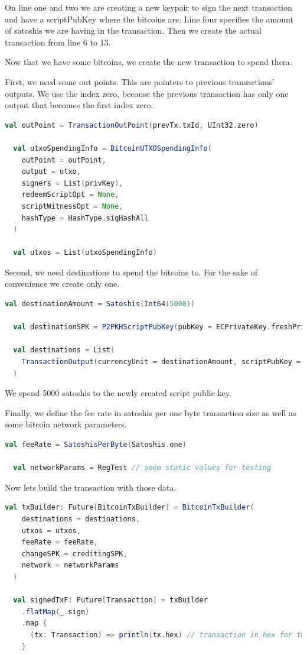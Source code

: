 On line one and two we are creating a new keypair to sign the next transaction and have a scriptPubKey where the bitcoins are.
Line four specifies the amount of satoshis we are having in the transaction.
Then we create the actual transaction from line 6 to 13.

Now that we have some bitcoins, we create the new transaction to spend them.

First, we need some out points.
This are pointers to previous transactions' outputs.
We use the index zero, because the previous transaction has only one output that becomes the first index zero.
\begin{lstlisting}[language=scala]
  val outPoint = TransactionOutPoint(prevTx.txId, UInt32.zero)

  val utxoSpendingInfo = BitcoinUTXOSpendingInfo(
    outPoint = outPoint,
    output = utxo,
    signers = List(privKey),
    redeemScriptOpt = None,
    scriptWitnessOpt = None,
    hashType = HashType.sigHashAll
  )

  val utxos = List(utxoSpendingInfo)
\end{lstlisting}

Second, we need destinations to spend the bitcoins to.
For the sake of convenience we create only one.
\begin{lstlisting}[language=scala]
  val destinationAmount = Satoshis(Int64(5000))

  val destinationSPK = P2PKHScriptPubKey(pubKey = ECPrivateKey.freshPrivateKey.publicKey)

  val destinations = List(
    TransactionOutput(currencyUnit = destinationAmount, scriptPubKey = destinationSPK)
  )
\end{lstlisting}

We spend 5000 satoshis to the newly created script public key.

Finally, we define the fee rate in satoshis per one byte transaction size as well as some bitcoin network parameters.
\begin{lstlisting}[language=scala]
  val feeRate = SatoshisPerByte(Satoshis.one)

  val networkParams = RegTest // soem static values for testing
\end{lstlisting}

Now lets build the transaction with those data.
\begin{lstlisting}[language=scala]
  val txBuilder: Future[BitcoinTxBuilder] = BitcoinTxBuilder(
    destinations = destinations,
    utxos = utxos,
    feeRate = feeRate,
    changeSPK = creditingSPK,
    network = networkParams
  )

  val signedTxF: Future[Transaction] = txBuilder
    .flatMap(_.sign)
    .map {
      (tx: Transaction) => println(tx.hex) // transaction in hex for the bitcoin network
    }
\end{lstlisting}

